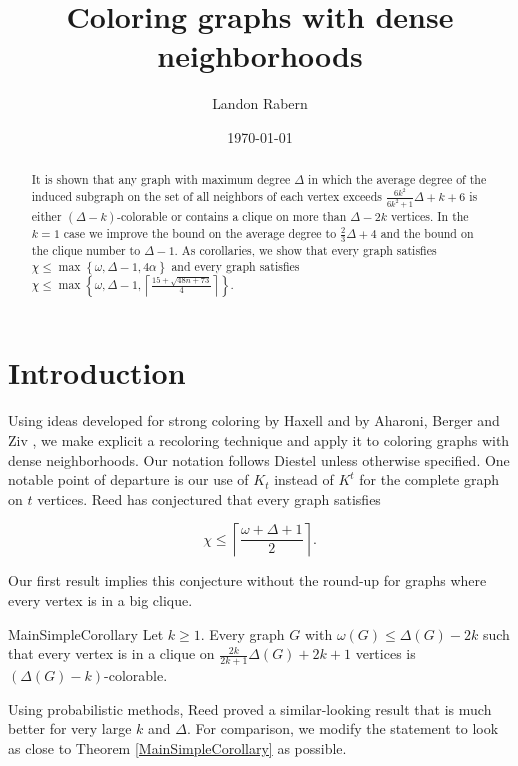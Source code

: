 \documentclass[12pt]{article}
\title{Coloring graphs with dense neighborhoods}
\author{Landon Rabern}
\date{\today}
\theoremstyle{plain}
\theoremstyle{definition}
\theoremstyle{remark}
\newcommand{\set}[1]{\left\{ #1 \right\}}
\newcommand{\ceil}[1]{\left\lceil#1\right\rceil}
\begin{document}
\maketitle

\begin{abstract}
It is shown that any graph with maximum degree $\Delta$ in which the average degree of the induced subgraph on the set of all neighbors of each vertex exceeds $\frac{6k^2}{6k^2 + 1}\Delta + k + 6$ is either $(\Delta - k)$-colorable or contains a clique on more than $\Delta - 2k$ vertices.  In the $k=1$ case we improve the bound on the average degree to $\frac23\Delta + 4$ and the bound on the clique number to $\Delta-1$.  As corollaries, we show that every graph satisfies $\chi \leq \max\set{\omega, \Delta - 1, 4\alpha}$ and every graph satisfies $\chi \leq \max\set{\omega, \Delta - 1, \ceil{\frac{15 + \sqrt{48n + 73}}{4}}}$.
\end{abstract}

\section{Introduction}
Using ideas developed for strong coloring by Haxell \cite{haxell2004strong} and by Aharoni, Berger and Ziv \cite{aharoni2007independent}, we make explicit a recoloring technique and apply it to coloring graphs with dense neighborhoods.  Our notation follows Diestel \cite{diestel2010} unless otherwise specified. One notable point of departure is our use of $K_t$ instead of $K^t$ for the complete graph on $t$ vertices.  Reed \cite{reed1998omega} has conjectured that every graph satisfies

\[\chi \leq \ceil{\frac{\omega + \Delta + 1}{2}}.\]

Our first result implies this conjecture without the round-up for graphs where every vertex is in a big clique.

\begin{repthm}{MainSimpleCorollary}
Let $k \geq 1$. Every graph $G$ with $\omega(G) \leq \Delta(G) - 2k$ such that every vertex is in a clique on $\frac{2k}{2k+1}\Delta(G) + 2k + 1$ vertices is $(\Delta(G)-k)$-colorable.
\end{repthm}

Using probabilistic methods, Reed \cite{reed1998omega} proved a similar-looking result that is much better for very large $k$ and $\Delta$.  For comparison, we modify the statement to look as close to Theorem \ref{MainSimpleCorollary} as possible.
\end{document}
